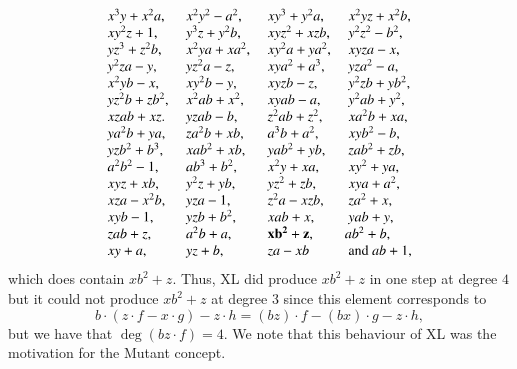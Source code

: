 \begin{example}
\[\begin{array}{llll}
 x^{3} y + x^{2} a, &\ x^{2} y^{2} - a^{2}, &\ x y^{3} + y^{2} a, &\ x^{2} y z + x^{2} b,\\
 x y^{2} z + 1,     &\ y^{3} z + y^{2} b,   &\ x y z^{2} + x z b, &\ y^{2} z^{2} - b^{2},\\
 y z^{3} + z^{2} b, &\ x^{2} y a + x a^{2}, &\ x y^{2} a + y a^{2},&\ x y z a - x,\\
 y^{2} z a - y,     &\ y z^{2} a - z,       &\ x y a^{2} + a^{3}, &\ y z a^{2} - a,\\
 x^{2} y b - x,     &\ x y^{2} b - y,       &\ x y z b - z,  &\ y^{2} z b + y b^{2},\\
 y z^{2} b + z b^{2}, &\ x^{2} a b + x^{2}, &\ x y a b - a, &\ y^{2} a b + y^{2},\\
 x z a b + x z. &\ y z a b - b,             &\ z^{2} a b + z^{2},&\ x a^{2} b + x a,\\
 y a^{2} b + y a, &\  z a^{2} b + x b, &\  a^{3} b + a^{2}, &\  x y b^{2} - b,\\
 y z b^{2} + b^{3}, &\  x a b^{2} + x b, &\  y a b^{2} + y b, &\  z a b^{2} + z b, \\ 
 a^{2} b^{2} - 1, &\  a b^{3} + b^{2}, &\  x^{2} y + x a, &\  x y^{2} + y a, \\ 
 x y z + x b, &\  y^{2} z + y b, &\  y z^{2} + z b, &\  x y a + a^{2}, \\ 
 x z a - x^{2} b, &\  y z a - 1, &\  z^{2} a - x z b, &\  z a^{2} + x, \\ 
 x y b - 1, &\  y z b + b^{2}, &\  x a b + x, &\  y a b + y, \\ 
 z a b + z, &\  a^{2} b + a, &\  {\bf x b^{2} + z}, \ & a b^{2} + b, \\ 
 x y + a, &\  y z + b, &\  z a - x b & \textnormal{ and }  a b + 1 ,\\
\end{array}
\]
which does contain $xb^{2} + z$. Thus, XL did produce $x b^{2} + z$ in one step at degree $4$ but it could not produce $xb^2 + z$ at degree 3 since this element corresponds to $$b\cdot (z\cdot f - x\cdot g) - z\cdot h = (bz)\cdot f -(bx)\cdot g - z\cdot h,$$ but we have that $\deg(bz\cdot f) = 4$. We note that this behaviour of XL was the motivation for the Mutant concept.
\end{example}
